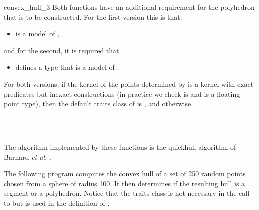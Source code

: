 \begin{ccRefFunction}{convex_hull_3}
Both functions have an additional requirement for the polyhedron that is
to be constructed. For the first version this is that:
\begin{itemize}
  \item {} is a model of ,
\end{itemize}
and for the second, it is required that
\begin{itemize}
 \item {} defines a type  that is a model of 
       .
\end{itemize}

For both versions, if the kernel  of the points determined by 
is a kernel with exact predicates but inexact constructions 
(in practice we check  is  and  is a floating point type),
then the default traits class of  is , and  otherwise.


\ccSeeAlso

 \\
  \\

\ccImplementation
The algorithm implemented by these functions is the quickhull algorithm of 
Barnard \textit{et al.} \cite{bdh-qach-96}.  

\ccExample

The following program computes the convex hull of a set of 250 random
points chosen from a sphere of radius 100.  It then determines if the resulting
hull is a segment or a polyhedron.  Notice that the traits class is not
necessary in the call to  but is used in the definition
of .


\end{ccRefFunction}
